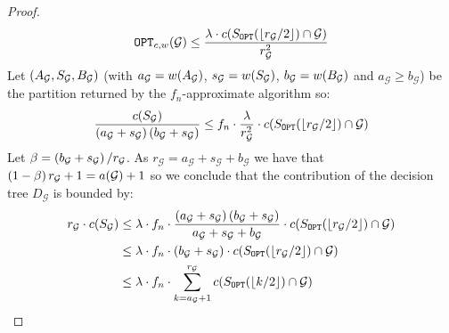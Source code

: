 \begin{theorem}
\begin{proof}
                $$\texttt{OPT}_{c,w}\mathopen{}\left( \mathcal{G} \right)\leq \frac{\lambda\cdot c\mathopen{}\left( S_{\texttt{OPT}}\mathopen{}\left( \mathopen{}\left\lfloor r_{\mathcal{G}}/2 \right\rfloor \right)\cap \mathcal{G} \right)}{r_{\mathcal{G}}^2}$$
        Let $\mathopen{}\left( A_{\mathcal{G}},S_{\mathcal{G}}, B_{\mathcal{G}} \right)$ (with $a_{\mathcal{G}}=w\mathopen{}\left( A_{\mathcal{G}} \right)$, $s_{\mathcal{G}}=w\mathopen{}\left( S_{\mathcal{G}} \right)$, $b_{\mathcal{G}}=w\mathopen{}\left( B_{\mathcal{G}} \right)$ and $a_{\mathcal{G}}\geq b_{\mathcal{G}}$) be the partition returned by the $f_n$-approximate algorithm so:
        $$
        \frac{c\mathopen{}\left( S_{\mathcal{G}} \right)}{\mathopen{}\left( a_{\mathcal{G}}+s_{\mathcal{G}} \right)\mathopen{}\left( b_{\mathcal{G}}+s_{\mathcal{G}} \right)}\leq f_n \cdot \frac{\lambda} {r_{\mathcal{G}}^2}\cdot c\mathopen{}\left( S_{\texttt{OPT}}\mathopen{}\left( \mathopen{}\left\lfloor r_{\mathcal{G}}/2 \right\rfloor \right)\cap \mathcal{G} \right)
        $$
        Let $\beta=\mathopen{}\left( b_{\mathcal{G}}+s_{\mathcal{G}} \right)/r_{\mathcal{G}}$. As $r_{\mathcal{G}}=a_{\mathcal{G}}+ s_{\mathcal{G}}+b_{\mathcal{G}}$ we have that $\mathopen{}\left( 1-\beta \right)r_{\mathcal{G}}+1 = a\mathopen{}\left( \mathcal{G} \right)+1$ so we conclude that the contribution of the decision tree $D_{\mathcal{G}}$ is bounded by:
        \begin{align*}
        r_{\mathcal{G}}\cdot c\mathopen{}\left( S_{\mathcal{G}} \right) &\leq \lambda \cdot f_n\cdot \frac{\mathopen{}\left( a_{\mathcal{G}}+s_{\mathcal{G}} \right)\mathopen{}\left( b_{\mathcal{G}}+s_{\mathcal{G}} \right)}{a_{\mathcal{G}}+s_{\mathcal{G}}+b_{\mathcal{G}}}\cdot c\mathopen{}\left( S_{\texttt{OPT}}\mathopen{}\left( \mathopen{}\left\lfloor r_{\mathcal{G}}/2 \right\rfloor \right)\cap \mathcal{G} \right)\\
        & \leq 
        \lambda \cdot f_n\cdot \mathopen{}\left( b_{\mathcal{G}}+s_{\mathcal{G}} \right)\cdot c\mathopen{}\left( S_{\texttt{OPT}}\mathopen{}\left( \mathopen{}\left\lfloor r_{\mathcal{G}}/2 \right\rfloor \right)\cap \mathcal{G} \right) \\
        &\leq 
        \lambda \cdot f_n\cdot \sum_{k=a_{\mathcal{G}}+1}^{r_{\mathcal{G}}}c\mathopen{}\left( S_{\texttt{OPT}}\mathopen{}\left( \mathopen{}\left\lfloor k/2 \right\rfloor \right)\cap \mathcal{G} \right)
        \end{align*}


\end{proof}
\end{theorem}
